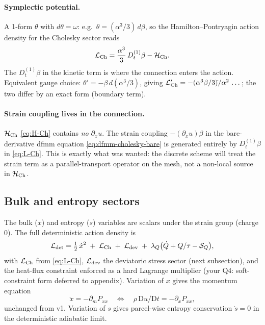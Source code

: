 \documentclass[11pt]{article}
\newcommand{\D}{\mathrm{D}}
\newcommand{\half}{\tfrac{1}{2}}
\begin{document}
\paragraph{Symplectic potential.} A 1-form $\theta$ with $d\theta = \omega$:
e.g.\ $\theta = (\alpha^3/3)\,d\beta$, so the Hamilton--Pontryagin action
density for the Cholesky sector reads
\begin{equation}
  \mathcal{L}_{\rm Ch} = \frac{\alpha^3}{3}\,D_t^{(1)}\beta - \mathcal{H}_{\rm Ch}.
  \label{eq:L-Ch}
\end{equation}
The $D_t^{(1)}\beta$ in the kinetic term is where the connection enters
the action. Equivalent gauge choice: $\theta' = -\beta\,d(\alpha^3/3)$,
giving $\mathcal{L}_{\rm Ch}' = -(\alpha^3 \beta/3)\dot{}/\alpha^2\,\dots$;
the two differ by an exact form (boundary term).

\paragraph{Strain coupling lives in the connection.} $\mathcal{H}_{\rm Ch}$
\eqref{eq:H-Ch} contains \emph{no} $\partial_x u$. The strain coupling
$-(\partial_x u)\beta$ in the bare-derivative dfmm equation
\eqref{eq:dfmm-cholesky-bare} is generated entirely by $D_t^{(1)}\beta$
in \eqref{eq:L-Ch}. This is exactly what was wanted: the discrete scheme
will treat the strain term as a parallel-transport operator on the mesh,
not a non-local source in $\mathcal{H}_{\rm Ch}$.

\subsection{Bulk and entropy sectors}
The bulk ($x$) and entropy ($s$) variables are scalars under the strain
group (charge 0). The full deterministic action density is
\begin{equation}
  \mathcal{L}_{\rm det} = \half\,\dot x^2 \;+\; \mathcal{L}_{\rm Ch} \;+\; \mathcal{L}_{\rm dev} \;+\; \lambda_Q\bigl(\dot Q + Q/\tau - \mathcal{S}_Q\bigr),
\end{equation}
with $\mathcal{L}_{\rm Ch}$ from \eqref{eq:L-Ch}, $\mathcal{L}_{\rm dev}$
the deviatoric stress sector (next subsection), and the heat-flux
constraint enforced as a hard Lagrange multiplier (your Q4: soft-constraint
form deferred to appendix). Variation of $x$ gives the momentum equation
\begin{equation}
  \ddot x = -\partial_m P_{xx} \quad\Longleftrightarrow\quad
  \rho\,\D u/\D t = -\partial_x P_{xx},
\end{equation}
unchanged from v1. Variation of $s$ gives parcel-wise entropy
conservation $\dot s = 0$ in the deterministic adiabatic limit.
\end{document}
